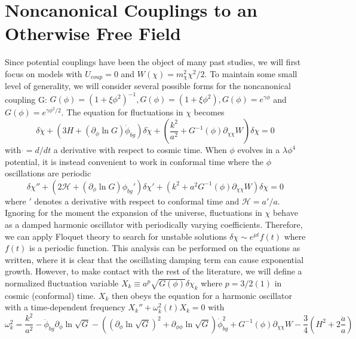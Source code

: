 \documentclass[a4paper,11pt]{article}
\begin{document}
\section{Noncanonical Couplings to an Otherwise Free Field}
Since potential couplings have been the object of many past studies, 
we will first focus on models with $U_{coup} = 0$ and $W(\chi) = m_\chi^2\chi^2/2$.
To maintain some small level of generality, we will consider several possible forms for the noncanonical coupling G:
$G(\phi) = (1+\xi\phi^2)^{-1}, G(\phi)=(1+\xi\phi^2), G(\phi)=e^{\gamma\phi}$ and $G(\phi)=e^{\gamma\phi^2/2}$.
The equation for fluctuations in $\chi$ becomes
\begin{equation}
  \delta\ddot{\chi} + \left(3H + (\partial_\phi\ln G)\dot{\phi}_{bg}\right)\delta\dot{\chi} + \left(\frac{k^2}{a^2} + G^{-1}(\phi)\partial_{\chi\chi}W \right)\delta\chi = 0
\end{equation}
with $\dot{} = d/dt$ a derivative with respect to cosmic time.
When $\phi$ evolves in a $\lambda\phi^4$ potential, it is instead convenient to work in conformal time where the $\phi$ oscillations are periodic
\begin{equation}
  \delta\chi'' + \left(2\mathcal{H} + (\partial_\phi\ln G)\phi_{bg}'\right)\delta\chi' + \left(k^2 + a^2G^{-1}(\phi)\partial_{\chi\chi}W \right)\delta\chi = 0
\end{equation}
where $'$ denotes a derivative with respect to conformal time and $\mathcal{H} = a'/a$.
Ignoring for the moment the expansion of the universe, fluctuations in $\chi$ behave as a damped harmonic oscillator with periodically varying coefficients.
Therefore, we can apply Floquet theory to search for unstable solutions $\delta\chi \sim e^{\mu t}f(t)$ where $f(t)$ is a periodic function.
This analysis can be performed on the equations as written, where it is clear that the oscillating damping term can cause exponential growth.
However, to make contact with the rest of the literature, we will define a normalized fluctuation variable $X_k \equiv a^p\sqrt{G(\phi)}\delta\chi_k$ where $p=3/2 (1)$ in cosmic (conformal) time.
$X_k$ then obeys the equation for a harmonic oscillator with a time-dependent frequency $X_k'' + \omega_k^2(t)X_k=0$ with
\begin{equation}
  \omega_k^2 = \frac{k^2}{a^2} - \ddot{\phi}_{bg}\partial_\phi\ln\sqrt{G} - \left( (\partial_\phi\ln\sqrt{G})^2 + \partial_{\phi\phi}\ln\sqrt{G}\right)\dot{\phi}_{bg}^2 + G^{-1}(\phi)\partial_{\chi\chi}W - \frac{3}{4}\left( H^2+2\frac{\ddot{a}}{a} \right)
\end{equation}
\end{document}
